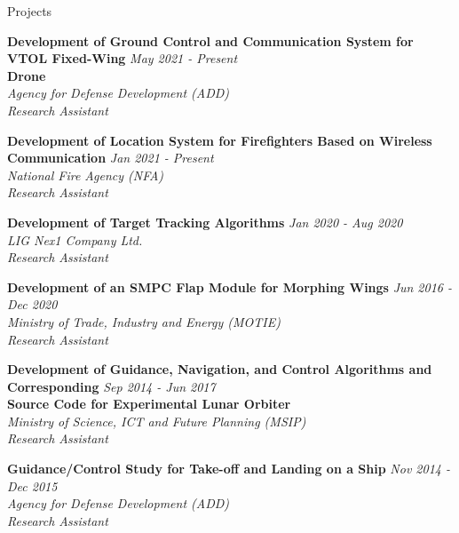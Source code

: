 \documentclass{resume}
\begin{document}
\begin{rSection}{Projects}

{\textbf{Development of Ground Control and Communication System for VTOL Fixed-Wing} \hfill {\em May 2021 - Present} \\ \textbf{Drone}} 
\\{\textit{ Agency for Defense Development (ADD)}}
\\{\textit{ Research Assistant}}

{\bf Development of Location System for Firefighters Based on Wireless Communication} \hfill {\em Jan 2021 - Present} 
\\{\textit{ National Fire Agency (NFA)}}
\\{\textit{ Research Assistant}}

{\bf Development of Target Tracking Algorithms} \hfill {\em Jan 2020 - Aug 2020} 
\\{\textit{ LIG Nex1 Company Ltd.}}
\\{\textit{ Research Assistant}}

{\bf Development of an SMPC Flap Module for Morphing Wings} \hfill {\em Jun 2016 - Dec 2020} 
\\{\textit{ Ministry of Trade, Industry and Energy (MOTIE)}}
\\{\textit{ Research Assistant}}

{\textbf{Development of Guidance, Navigation, and Control Algorithms and Corresponding} \hfill {\em Sep 2014 - Jun 2017} \\ \textbf{Source Code for Experimental Lunar Orbiter}}  
\\{\textit{ Ministry of Science, ICT and Future Planning (MSIP)}}
\\{\textit{ Research Assistant}}

{\bf Guidance/Control Study for Take-off and Landing on a Ship} \hfill {\em Nov 2014 - Dec 2015} 
\\{\textit{ Agency for Defense Development (ADD)}}
\\{\textit{ Research Assistant}}



\end{rSection}
\end{document}
